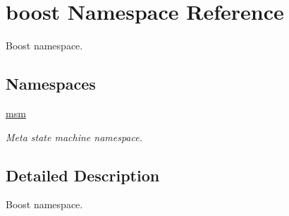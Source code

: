 \hypertarget{namespaceboost}{\section{boost Namespace Reference}
\label{namespaceboost}
}


Boost namespace.  


\subsection*{Namespaces}
\begin{DoxyCompactItemize}
\item 
\hyperlink{namespaceboost_1_1msm}{msm}
\begin{DoxyCompactList}\small\item\em Meta state machine namespace. \end{DoxyCompactList}\end{DoxyCompactItemize}


\subsection{Detailed Description}
Boost namespace. 